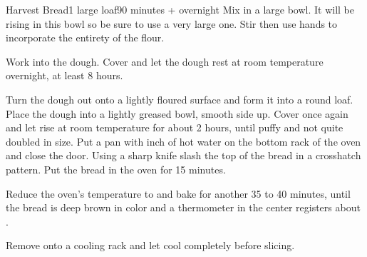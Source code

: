 \documentclass[../Cookbook.tex]{subfiles}
\begin{document}
\begin{recipe}[HarvestBread]{Harvest Bread}{1 large loaf}{90 minutes + overnight}
Mix in a large bowl.
It will be rising in this bowl so be sure to use a very large one.
Stir then use hands to incorporate the entirety of the flour.

Work into the dough.
Cover and let the dough rest at room temperature overnight, at least 8 hours.

Turn the dough out onto a lightly floured surface and form it into a round loaf.
Place the dough into a lightly greased bowl, smooth side up.
Cover once again and let rise at room temperature for about 2 hours, until puffy and not quite doubled in size.
Put a pan with  inch of hot water on the bottom rack of the oven and close the door.
Using a sharp knife slash the top of the bread in a crosshatch pattern.
Put the bread in the oven for 15 minutes.

Reduce the oven's temperature to  and bake for another 35 to 40 minutes, until the bread is deep brown in color and a thermometer in the center registers about .

Remove onto a cooling rack and let cool completely before slicing.
\end{recipe}
\end{document}
